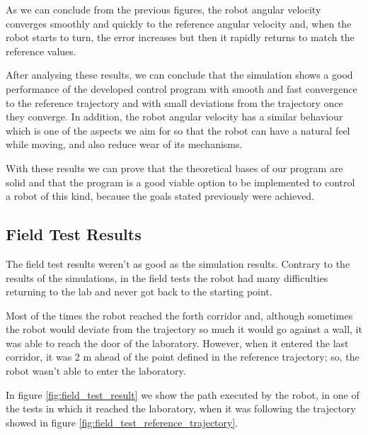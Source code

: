 \documentclass[11pt,a4paper]{scrartcl}
\begin{document}
As we can conclude from the previous figures, the robot angular velocity converges smoothly and quickly to the reference angular velocity and, when the robot starts to turn, the error increases but then it rapidly returns to match the reference values.

After analysing these results, we can conclude that the simulation shows a good performance of the developed control program with smooth and fast convergence to the reference trajectory and with small deviations from the trajectory once they converge. In addition, the robot angular velocity has a similar behaviour which is one of the aspects we aim for so that the robot can have a natural feel while moving, and also reduce wear of its mechanisms.

With these results we can prove that the theoretical bases of our program are solid and that the program is a good viable option to be implemented to control a robot of this kind, because the goals stated previously were achieved.

\subsection{Field Test Results}
The field test results weren't as good as the simulation results. Contrary to the results of the simulations, in the field tests the robot had many difficulties returning to the lab and never got back to the starting point.

Most of the times the robot reached the forth corridor and, although sometimes the robot would deviate from the trajectory so much it would go against a wall, it was able to reach the door of the laboratory. However, when it entered the last corridor, it was 2 m ahead of the point defined in the reference trajectory; so, the robot wasn't able to enter the laboratory.

In figure \ref{fig:field_test_result} we show the path executed by the robot, in one of the tests in which it reached the laboratory, when it was following the trajectory showed in figure \ref{fig:field_test_reference_trajectory}. 
\end{document}
